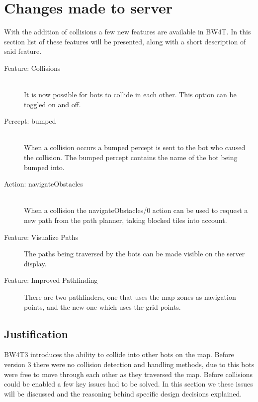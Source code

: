 \section{Changes made to server}
With the addition of collisions a few new features are available in BW4T. In this section list of these features will be presented, along with a short description of said feature.

\begin{description}
	\item[Feature: Collisions] \hfill \\
		It is now possible for bots to collide in each other. This option can be toggled on and off.
	\item[Percept: bumped] \hfill \\
		When a collision occurs a bumped percept is sent to the bot who caused the collision. The bumped percept contains the name of the bot being bumped into.
	\item[Action: navigateObstacles] \hfill \\
		When a collision the navigateObstacles/0 action can be used to request a new path from the path planner, taking blocked tiles into account.
	\item[Feature: Visualize Paths]
		The paths being traversed by the bots can be made visible on the server display. 
	\item[Feature: Improved Pathfinding]
		There are two pathfinders, one that uses the map zones as navigation points, and the new one which uses the grid points. 
\end{description}
		
\subsection*{Justification}
BW4T3 introduces the ability to collide into other bots on the map. Before version 3 there were no collision detection and handling methods, due to this bots were free to move through each other as they traversed the map. Before collisions could be enabled a few key issues had to be solved. In this section we these issues will be discussed and the reasoning behind specific design decisions explained. 

